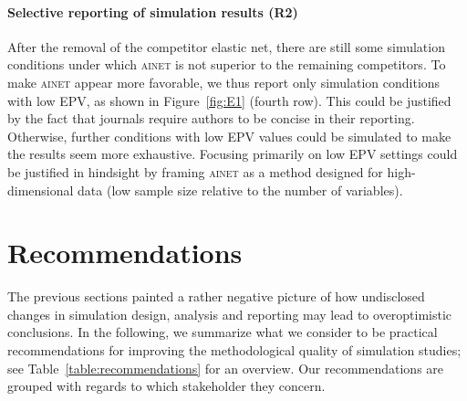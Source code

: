 \documentclass[a4paper, 11pt]{article}
\newcommand{\ainet}{\textsc{ainet}}
\begin{document}
\paragraph{Selective reporting of simulation results (R2)}
After the removal of the competitor elastic net, there are still
some simulation conditions under which \ainet{} is not superior to
the remaining competitors. To make \ainet{} appear more favorable, we
thus report only simulation conditions with low EPV, as shown in
Figure~\ref{fig:E1} (fourth row).
This could be justified by the fact that journals require
authors to be concise in their reporting.
Otherwise, further conditions with low EPV values could be simulated to
make the results seem more exhaustive.
Focusing primarily on low EPV settings could be justified in
hindsight by framing \ainet{} as a method designed for high-dimensional
data (low sample size relative to the number of variables).

\section{Recommendations}
\label{sec:recommendations}

The previous sections painted a rather negative picture of how
undisclosed changes in simulation design, analysis and reporting
may lead to overoptimistic conclusions. In the
following, we summarize what we consider to be practical recommendations for
improving the methodological quality of simulation studies; see
Table~\ref{table:recommendations} for an overview. Our recommendations are
grouped with regards to which stakeholder they concern.
\end{document}
